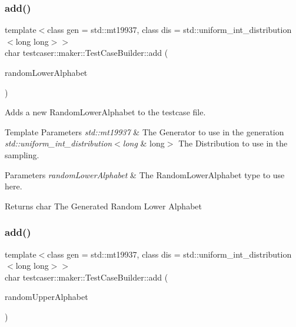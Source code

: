\subsubsection{\texorpdfstring{add()}{add()}\hspace{0.1cm}{\footnotesize\ttfamily [2/11]}}
{\footnotesize\ttfamily template$<$class gen  = std\+::mt19937, class dis  = std\+::uniform\+\_\+int\+\_\+distribution$<$long long$>$$>$ \\
char testcaser\+::maker\+::\+Test\+Case\+Builder\+::add (\begin{DoxyParamCaption}\item[{\hyperlink{classtestcaser_1_1maker_1_1types_1_1RandomLowerAlphabet}{types\+::\+Random\+Lower\+Alphabet}$<$ gen, dis $>$ \&}]{random\+Lower\+Alphabet }\end{DoxyParamCaption})\hspace{0.3cm}{\ttfamily [inline]}}



Adds a new Random\+Lower\+Alphabet to the testcase file. 


\begin{DoxyTemplParams}{Template Parameters}
{\em std\+::mt19937} & The Generator to use in the generation \\
\hline
{\em std\+::uniform\+\_\+int\+\_\+distribution$<$long} & long$>$ The Distribution to use in the sampling. \\
\hline
\end{DoxyTemplParams}

\begin{DoxyParams}{Parameters}
{\em random\+Lower\+Alphabet} & The Random\+Lower\+Alphabet type to use here. \\
\hline
\end{DoxyParams}
\begin{DoxyReturn}{Returns}
char The Generated Random Lower Alphabet 
\end{DoxyReturn}
\mbox{\label{classtestcaser_1_1maker_1_1TestCaseBuilder_a0d02a42731de8cffd9cc5be67d49290e}} 
\subsubsection{\texorpdfstring{add()}{add()}\hspace{0.1cm}{\footnotesize\ttfamily [3/11]}}
{\footnotesize\ttfamily template$<$class gen  = std\+::mt19937, class dis  = std\+::uniform\+\_\+int\+\_\+distribution$<$long long$>$$>$ \\
char testcaser\+::maker\+::\+Test\+Case\+Builder\+::add (\begin{DoxyParamCaption}\item[{\hyperlink{classtestcaser_1_1maker_1_1types_1_1RandomUpperAlphabet}{types\+::\+Random\+Upper\+Alphabet}$<$ gen, dis $>$ \&}]{random\+Upper\+Alphabet }\end{DoxyParamCaption})\hspace{0.3cm}{\ttfamily [inline]}}



